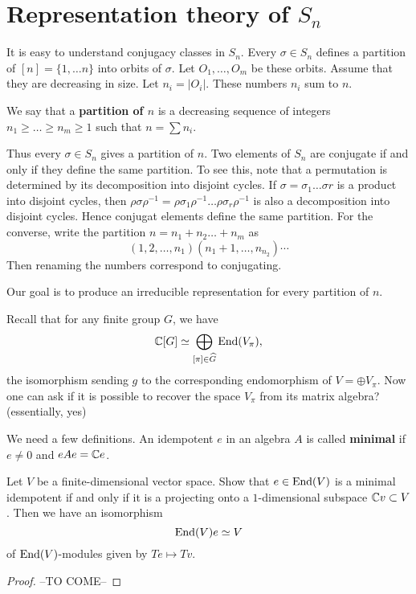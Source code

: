 \documentclass[11pt, english]{article}
\begin{document}
\newpage
\section{Representation theory of $S_n$}

It is easy to understand conjugacy classes in $S_n$. Every $\sigma \in S_n$ defines a partition of $[n] = \{ 1,\ldots n\}$ into orbits of $\sigma$. Let $O_1,\ldots,O_m$ be these orbits. Assume that they are decreasing in size. Let $n_i=\lvert O_i \rvert$. These numbers $n_i$ sum to $n$.

We say that a \textbf{partition of $n$} is a decreasing sequence of integers $n_1 \geq \ldots \geq n_m \geq 1$ such that $n=\sum n_i$. 

Thus every $\sigma \in S_n$ gives a partition of $n$. Two elements of $S_n$ are conjugate if and only if they define the same partition. To see this, note that a permutation is determined by its decomposition into disjoint cycles. If $\sigma = \sigma_1 \ldots \sigma r $ is a product into disjoint cycles, then $\rho \sigma \rho^{-1}=\rho \sigma_1 \rho^{-1} \ldots \rho \sigma_r \rho^{-1}$ is also a decomposition into disjoint cycles. Hence conjugat elements define the same partition. For the converse, write the partition $n = n_1 + n_2 \ldots + n_m$ as
$$
(1,2,\ldots,n_1)(n_{1}+1, \ldots,n_{n_2}) \cdots 
$$
Then renaming the numbers correspond to conjugating.

Our goal is to produce an irreducible representation for every partition of $n$.

Recall that for any finite group $G$, we have
$$
\mathbb{C} [G] \simeq \bigoplus_{[\pi] \in \widehat G} \operatorname{End}(V_\pi),
$$
the isomorphism sending $g$ to the corresponding endomorphism of $V = \oplus V_\pi$. Now one can ask if it is possible to recover the space $V_\pi$ from its matrix algebra? (essentially, yes)

We need a few definitions. An idempotent $e$ in an algebra $A$ is called \textbf{minimal} if $e \neq 0$ and $eAe =\mathbb{C} e$. 


\begin{lemma}
 Let $V$ be a finite-dimensional vector space. Show that $e \in \operatorname{End}(V)$ is a minimal idempotent if and only if it is a projecting onto a $1$-dimensional subspace $\mathbb{C} v \subset V$. Then we have an isomorphism
$$
\operatorname{End}(V)e \simeq V
$$
of $\operatorname{End}(V)$-modules given by $Te \mapsto Tv$. 
\end{lemma}
\begin{proof}
--TO COME--
\end{proof}
\end{document}
